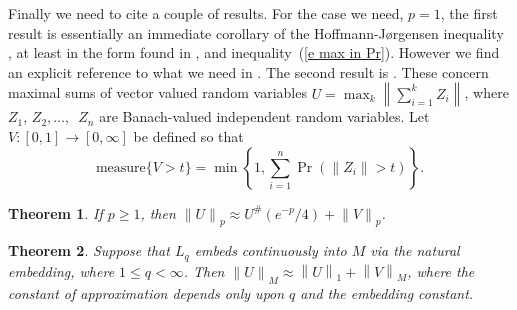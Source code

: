 \documentclass[12pt]{amsart}
\newtheorem{thm}{Theorem}
\newcommand{\normo}[1]{{\left\|#1\right\|}}
\newcommand{\snormo}[1]{{\mathopen\|#1\mathclose\|}}
\newcommand{\measure}{\text{measure}}
\begin{document}
Finally we need to cite a couple of results.
For the case we need, $p=1$, the first result is essentially an 
immediate corollary of the 
Hoffmann-J{\o}rgensen inequality \cite{hoffmann-jorgensen}, at least
in the form found in \cite[Proposition~1.3.2]{kwapien-woyczynski}, 
and inequality~(\ref{e max in Pr}).
However we find an explicit reference to what we need in
\cite[Theorem 6.1]{hitczenko-montgomery-smith}.
The second result is
\cite[Theorem 7.1]{hitczenko-montgomery-smith}.
These concern maximal sums of vector valued random variables
$U = \max_k \normo{\sum_{i=1}^k Z_i}$, where $Z_1$, $Z_2,\dots,$\
$Z_n$ are Banach-valued independent random variables.
Let $V:[0,1]\to[0,\infty]$ be defined so that
\[
   \measure\{V>t\} = \min\left\{ 1 ,
   \sum_{i=1}^n \Pr(\snormo{Z_i} > t) \right\} .
\]

\begin{thm}
\label{t lp}
If
$p \ge 1$, 
then
$ \snormo U_p \approx U^\#(e^{-p}/4) + \snormo V_p $.
\end{thm}

\begin{thm}
\label{t r.i.}
Suppose that $L_q$ embeds continuously into $M$ via the natural embedding,
where $1 \le q < \infty$.  Then
$ \snormo U_M  \approx \normo U_1 + \normo V_M $,
where the constant of approximation depends only upon $q$ and the embedding
constant.
\end{thm}
\end{document}
